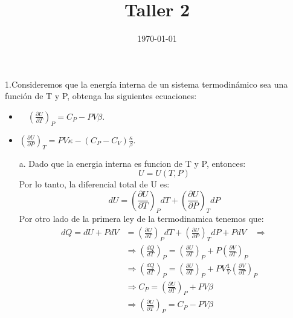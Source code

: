 \documentclass[a4paper]{article}
\date{\today}
\title{Taller 2}
\begin{document}
    \header{}

    
    1.Consideremos que la energía interna de un sistema termodinámico sea una función de T y P,
    obtenga las siguientes ecuaciones:
    \begin{itemize}
        \item  $\quad\left(\frac{\partial U}{\partial T}\right)_P=C_P-P V \beta$.
        \item $\left(\frac{\partial U}{\partial P}\right)_T=P V \kappa-\left(C_P-C_V\right) \frac{\kappa}{\beta}$.
    \end{itemize}
    \begin{answer}[Problema 1]
        \begin{itemize}
            \item[a.]Dado que la energia interna es funcion de T y P, entonces:
            \begin{equation}
                U=U(T,P)
            \end{equation}
            Por lo tanto, la diferencial total de U es:
            \begin{equation}
                dU=\left(\frac{\partial U}{\partial T}\right)_P dT+\left(\frac{\partial U}{\partial P}\right)_T dP
            \end{equation}
            Por otro lado de la primera ley de la termodinamica tenemos que:
            \begin{align*}
                d Q = dU + PdV &=\left( \frac{\partial U}{\partial T} \right)_P dT + \left( \frac{\partial U}{\partial P} \right)_T dP + PdV \quad \Rightarrow\\
                & \Rightarrow \left(
                    \frac{dQ}{dT}
                \right)_P = \left( \frac{\partial U}{\partial T} \right)_P + P \left( \frac{\partial V}{\partial T} \right)_P\\
                & \Rightarrow \left(
                    \frac{dQ}{dT}
                    \right)_P = \left( \frac{\partial U}{\partial T} \right)_P + PV \frac{1}{V} \left( \frac{\partial V}{\partial T} \right)_P\\
                & \Rightarrow 
                        C_P = \left( \frac{\partial U}{\partial T} \right)_P + PV \beta\\
                & \Rightarrow \left(
                    \frac{\partial U}{\partial T}
                    \right)_P = C_P - PV \beta
            \end{align*}   
    

\end{itemize}
\end{answer}
\end{document}
